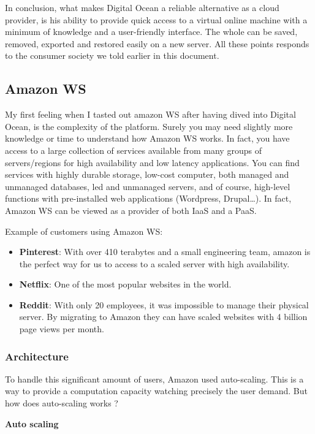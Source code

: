 In conclusion, what makes Digital Ocean a reliable alternative as a cloud provider, is his ability to provide quick access to a virtual online machine with a minimum of knowledge and a user-friendly interface. The whole can be saved, removed, exported and restored easily on a new server. All these points responds to the consumer society we told earlier in this document.
\subsection{Amazon WS}

My first feeling when I tasted out amazon WS after having dived into Digital Ocean, is the complexity of the platform. Surely you may need slightly more knowledge or time to understand how Amazon WS works. In fact, you have access to a large collection of services available from many groups of servers/regions for high availability and low latency applications. You can find services with highly durable storage, low-cost computer, both managed and unmanaged databases, led and unmanaged servers, and of course, high-level functions with pre-installed web applications (Wordpress, Drupal…). In fact, Amazon WS can be viewed  as a provider of both IaaS and a PaaS.

Example of customers using Amazon WS:

\begin{itemize}
    \item \textbf{Pinterest}: With over 410 terabytes and a small engineering team, amazon is the perfect way for us to access to a scaled server with high availability.
    \item \textbf{Netflix}: One of the most popular websites in the world.
    \item \textbf{Reddit}: With only 20 employees, it was impossible to manage their physical server. By migrating to Amazon they can have scaled websites with 4 billion page views per month.
\end{itemize}

\subsubsection{Architecture}

To handle this significant amount of users, Amazon used auto-scaling. This is a way to provide a computation capacity watching precisely the user demand. But how does auto-scaling works ?

\textbf{Auto scaling}


